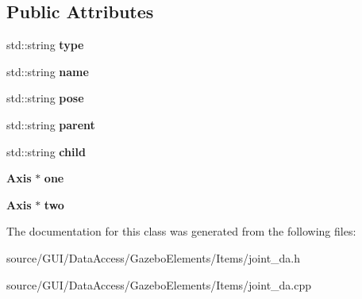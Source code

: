 \subsection*{Public Attributes}
\begin{DoxyCompactItemize}
\item 
std\+::string {\bfseries type}\label{classjoint___d_a_a598671e88c867e0f971b69984a46f3a9}

\item 
std\+::string {\bfseries name}\label{classjoint___d_a_a16be578eefefe8127028de750c0c454a}

\item 
std\+::string {\bfseries pose}\label{classjoint___d_a_aff3d0ed3f416eb4a542d677fe7636162}

\item 
std\+::string {\bfseries parent}\label{classjoint___d_a_a2ba57fe69f53709022c190b6f473163e}

\item 
std\+::string {\bfseries child}\label{classjoint___d_a_a10a9894eec4142bcb129651bedacd4cb}

\item 
{\bf Axis} $\ast$ {\bfseries one}\label{classjoint___d_a_a702bebe52ece9eb0ac465fed5a0ad734}

\item 
{\bf Axis} $\ast$ {\bfseries two}\label{classjoint___d_a_a37817f878cc043ba3c77ea987adab14d}

\end{DoxyCompactItemize}


The documentation for this class was generated from the following files\+:\begin{DoxyCompactItemize}
\item 
source/\+G\+U\+I/\+Data\+Access/\+Gazebo\+Elements/\+Items/joint\+\_\+da.\+h\item 
source/\+G\+U\+I/\+Data\+Access/\+Gazebo\+Elements/\+Items/joint\+\_\+da.\+cpp\end{DoxyCompactItemize}
